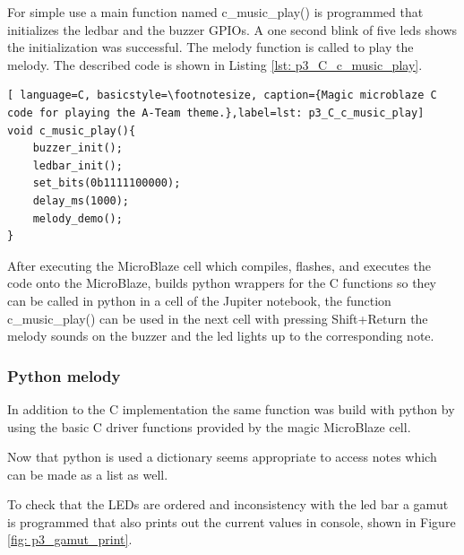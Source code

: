 For simple use a main function named c\_music\_play() is programmed that initializes the ledbar and the buzzer GPIOs. A one second blink of five leds shows the initialization was successful. The melody function is called to play the melody. The described code is shown in Listing \ref{lst: p3_C_c_music_play}.
\begin{lstlisting}[ language=C, basicstyle=\footnotesize, caption={Magic microblaze C code for playing the A-Team theme.},label=lst: p3_C_c_music_play]
void c_music_play(){
	buzzer_init();
	ledbar_init();
	set_bits(0b1111100000);
	delay_ms(1000);
	melody_demo();
}
\end{lstlisting}

After executing the MicroBlaze cell which compiles, flashes, and executes the code onto the MicroBlaze, builds python wrappers for the C functions so they can be called in python in a cell of the Jupiter notebook, the function c\_music\_play() can be used in the next cell with pressing Shift+Return the melody sounds on the buzzer and the led lights up to the corresponding note.

\subsubsection{Python melody}
In addition to the C implementation the same function was build with python by using the basic C driver functions provided by the magic MicroBlaze cell. 

Now that python is used a dictionary seems appropriate to access notes which can be made as a list as well.

To check that the LEDs are ordered and inconsistency with the led bar a gamut is programmed that also prints out the current values in console, shown in Figure \ref{fig: p3_gamut_print}.

